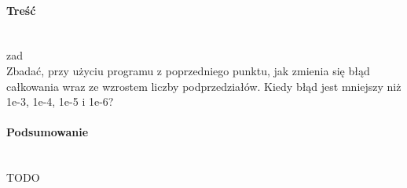 \paragraph{Treść}~\\
{zad}\\
Zbadać, przy użyciu programu z poprzedniego punktu, jak zmienia się błąd całkowania wraz ze wzrostem liczby podprzedziałów.
Kiedy błąd jest mniejszy niż 1e-3, 1e-4, 1e-5 i 1e-6?

\paragraph{Podsumowanie}~\\
TODO
